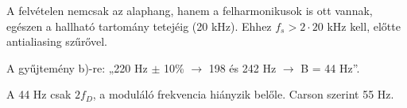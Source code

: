 \begin{center}\end{center}

A felvételen nemcsak az alaphang, hanem a felharmonikusok is ott vannak, egészen a hallható tartomány tetejéig (20 kHz). Ehhez $f_s>2\cdot20$ kHz kell, előtte antialiasing szűrővel.

\begin{center}\end{center}
\begin{tipp}
A gyűjtemény b)-re: „220 Hz $\pm$ 10\% $\to$ 198 és 242 Hz $\to$ B = 44 Hz”.
\end{tipp}
\begin{figyelem}[Javítás]
A 44 Hz csak $2f_D$, a moduláló frekvencia hiányzik belőle. Carson szerint 55 Hz.
\end{figyelem}
\begin{eredmeny}

\begin{center}\end{center}
\end{eredmeny}


